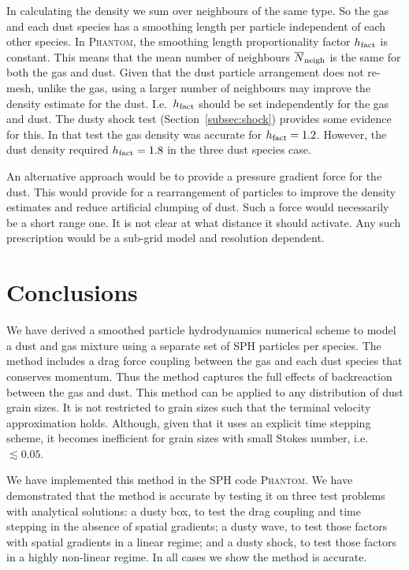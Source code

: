 \documentclass[fleqn,usenatbib]{mnras}
\begin{document}
In calculating the density we sum over neighbours of the same type. So the gas
and each dust species has a smoothing length per particle independent of each
other species. In \textsc{Phantom}, the smoothing length proportionality factor
\(h_{\rm fact}\) is constant. This means that the mean number of neighbours
\(\overline{N}_{\rm neigh}\) is the same for both the gas and dust. Given that
the dust particle arrangement does not re-mesh, unlike the gas, using a larger
number of neighbours may improve the density estimate for the dust. I.e.\
\(h_{\rm fact}\) should be set independently for the gas and dust. The dusty
shock test (Section~\ref{subsec:shock}) provides some evidence for this. In
that test the gas density was accurate for \(h_{\rm fact} = 1.2\). However, the
dust density required \(h_{\rm fact} = 1.8\) in the three dust species case.

An alternative approach would be to provide a pressure gradient force for the
dust. This would provide for a rearrangement of particles to improve the density
estimates and reduce artificial clumping of dust. Such a force would necessarily
be a short range one. It is not clear at what distance it should activate. Any
such prescription would be a sub-grid model and resolution dependent.


\section{Conclusions}

We have derived a smoothed particle hydrodynamics numerical scheme to model a
dust and gas mixture using a separate set of SPH particles per species. The
method includes a drag force coupling between the gas and each dust species that
conserves momentum. Thus the method captures the full effects of backreaction
between the gas and dust. This method can be applied to any distribution of dust
grain sizes. It is not restricted to grain sizes such that the terminal velocity
approximation holds. Although, given that it uses an explicit time stepping
scheme, it becomes inefficient for grain sizes with small Stokes number, i.e.
\(\lesssim 0.05\).

We have implemented this method in the SPH code \textsc{Phantom}. We have
demonstrated that the method is accurate by testing it on three test problems
with analytical solutions: a dusty box, to test the drag coupling and time
stepping in the absence of spatial gradients; a dusty wave, to test those
factors with spatial gradients in a linear regime; and a dusty shock, to test
those factors in a highly non-linear regime. In all cases we show the method is
accurate.
\end{document}
